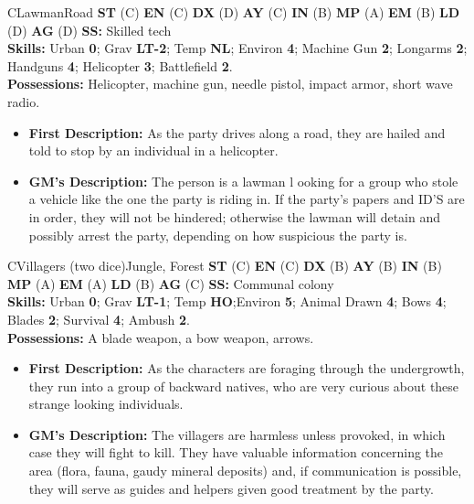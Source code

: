 \hrulefill

\begin{npc}{C}{Lawman}{Road}
\textbf{ST} (C) \textbf{EN} (C) \textbf{DX} (D) \textbf{AY} (C) \textbf{IN} (B) \textbf{MP} (A) \textbf{EM} (B) \textbf{LD} (D) \textbf{AG} (D) \textbf{SS:} Skilled tech \\
\textbf{Skills:} Urban \textbf{0}; Grav \textbf{LT-2}; Temp  \textbf{NL}; Environ \textbf{4}; Machine Gun \textbf{2}; Longarms \textbf{2}; Handguns \textbf{4}; Helicopter \textbf{3}; Battlefield \textbf{2}. \\
\textbf{Possessions:} Helicopter, machine gun, needle pistol, impact armor, short wave radio. 
\begin{itemize}
\item \textbf{First Description:} As the party drives along a road, they are hailed and told to stop by an individual in a helicopter. 
\item \textbf{GM's Description:} The person is a lawman l ooking for a group who stole a vehicle like the one the party is riding in. If the party's 
papers and ID'S are in order, they will not be hindered; otherwise the lawman will detain and possibly arrest the party, depending on 
how suspicious the party is. 
\end{itemize}
\end{npc}

\hrulefill

\begin{npc}{C}{Villagers (two dice)}{Jungle, Forest}
\textbf{ST} (C) \textbf{EN} (C) \textbf{DX} (B) \textbf{AY} (B) \textbf{IN} (B) \textbf{MP} (A) \textbf{EM} (A) \textbf{LD} (B) \textbf{AG} (C) \textbf{SS:} Communal colony \\
\textbf{Skills:} Urban \textbf{0}; Grav \textbf{LT-1}; Temp \textbf{HO};Environ \textbf{5}; Animal Drawn \textbf{4}; Bows \textbf{4}; Blades \textbf{2}; Survival \textbf{4}; Ambush \textbf{2}. \\
\textbf{Possessions:} A blade weapon, a bow weapon, arrows. 
\begin{itemize}
\item \textbf{First Description:} As the characters are foraging through the undergrowth, they run into a group of backward natives, who are very 
curious about these strange looking individuals. 
\item \textbf{GM's Description:} The villagers are harmless unless provoked, in which case they will fight to kill. They have valuable information 
concerning the area (flora, fauna, gaudy mineral deposits) and, if communication is possible, they will serve as guides and helpers 
given good treatment by the party. 
\end{itemize}
\end{npc}

